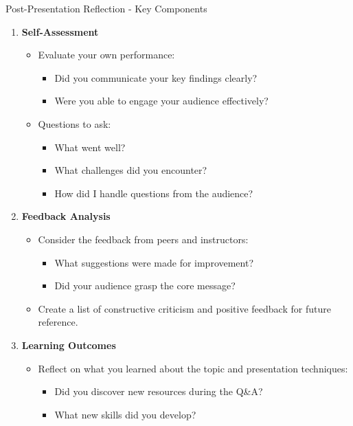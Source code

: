 \documentclass[aspectratio=169]{beamer}
\begin{document}
\begin{frame}[fragile]{Post-Presentation Reflection - Key Components}
    \begin{enumerate}
        \item \textbf{Self-Assessment}
        \begin{itemize}
            \item Evaluate your own performance:
            \begin{itemize}
                \item Did you communicate your key findings clearly?
                \item Were you able to engage your audience effectively?
            \end{itemize}
            \item Questions to ask:
            \begin{itemize}
                \item What went well?
                \item What challenges did you encounter?
                \item How did I handle questions from the audience?
            \end{itemize}
        \end{itemize}
        
        \item \textbf{Feedback Analysis}
        \begin{itemize}
            \item Consider the feedback from peers and instructors:
            \begin{itemize}
                \item What suggestions were made for improvement?
                \item Did your audience grasp the core message?
            \end{itemize}
            \item Create a list of constructive criticism and positive feedback for future reference.
        \end{itemize}

        \item \textbf{Learning Outcomes}
        \begin{itemize}
            \item Reflect on what you learned about the topic and presentation techniques:
            \begin{itemize}
                \item Did you discover new resources during the Q\&A?
                \item What new skills did you develop?
            \end{itemize}
        \end{itemize}
    \end{enumerate}
\end{frame}
\end{document}
